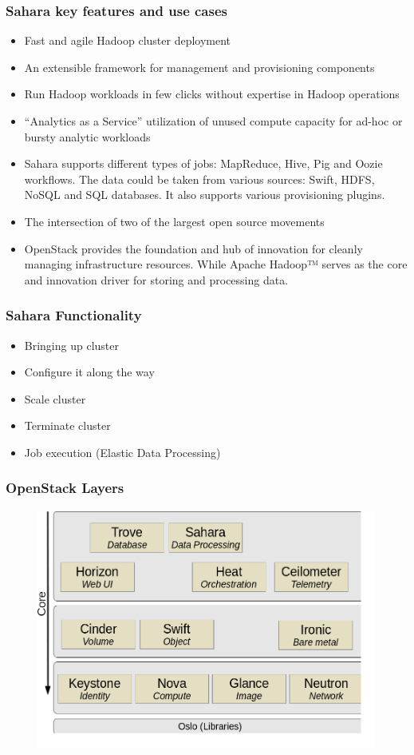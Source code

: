 \begin{frame}
	\frametitle{Sahara key features and use cases}
	\begin{itemize}
		\item Fast and agile Hadoop cluster deployment
		\item An extensible framework for management and provisioning components
		\item Run Hadoop workloads in few clicks without expertise in Hadoop operations
		\item “Analytics as a Service” utilization of unused compute capacity for ad-hoc or bursty analytic workloads
		\item Sahara supports different types of jobs: MapReduce, Hive, Pig and Oozie workflows. The data could be taken from various sources: Swift, HDFS, NoSQL and SQL databases. It also  supports various provisioning plugins.
		\item The intersection of two of the largest open source movements
		\item OpenStack provides  the foundation and hub of innovation for cleanly managing infrastructure resources. While Apache Hadoop™ serves as the core and innovation driver for storing and processing data.
	\end{itemize}
\end{frame}

\begin{frame}
	\frametitle{Sahara Functionality}
	\begin{itemize}
		\item Bringing up cluster
		\item Configure it along the way
		\item Scale cluster
		\item Terminate cluster
		\item Job execution (Elastic Data Processing)
	\end{itemize}
\end{frame}

\begin{frame}
	\frametitle{OpenStack Layers}
	\begin{figure}
		\includegraphics[width=1\linewidth]{images/openstack_layers.png}
	\end{figure}
\end{frame}

